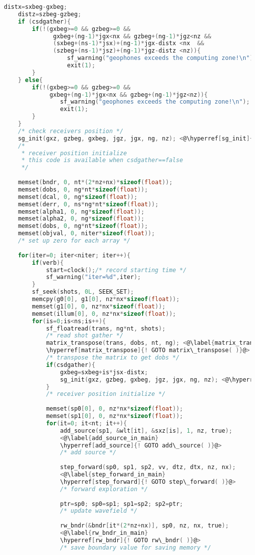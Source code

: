 \documentclass[a4paper,11pt]{article}
\theoremstyle{mytheor}
\begin{document}
\begin{lstlisting}[label={main},language=C,tabsize=4,caption=main()]
	distx=sxbeg-gxbeg;
	distz=szbeg-gzbeg;
	if (csdgather){
		if(!(gxbeg>=0 && gzbeg>=0 && 
		      gxbeg+(ng-1)*jgx<nx && gzbeg+(ng-1)*jgz<nz &&
			  (sxbeg+(ns-1)*jsx)+(ng-1)*jgx-distx <nx  &&
			  (szbeg+(ns-1)*jsz)+(ng-1)*jgz-distz <nz)){ 
				  sf_warning("geophones exceeds the computing zone!\n"); 
				  exit(1); 
		}
	} else{
		if(!(gxbeg>=0 && gzbeg>=0 && 
			 gxbeg+(ng-1)*jgx<nx && gzbeg+(ng-1)*jgz<nz)){
			 	sf_warning("geophones exceeds the computing zone!\n"); 
			 	exit(1); 
		}
	}
	/* check receivers position */
	sg_init(gxz, gzbeg, gxbeg, jgz, jgx, ng, nz); <@\hyperref[sg_init]{! GOTO sg\_init( )}@>
	/* 
	 * receiver position initialize
	 * this code is available when csdgather==false 
	 */
	
	memset(bndr, 0, nt*(2*nz+nx)*sizeof(float));
	memset(dobs, 0, ng*nt*sizeof(float));
	memset(dcal, 0, ng*sizeof(float));
	memset(derr, 0, ns*ng*nt*sizeof(float));
	memset(alpha1, 0, ng*sizeof(float));
	memset(alpha2, 0, ng*sizeof(float));
	memset(dobs, 0, ng*nt*sizeof(float));	
	memset(objval, 0, niter*sizeof(float));
	/* set up zero for each array */
	
	for(iter=0; iter<niter; iter++){
		if(verb){
			start=clock();/* record starting time */
			sf_warning("iter=%d",iter);
		}
		sf_seek(shots, 0L, SEEK_SET);
		memcpy(g0[0], g1[0], nz*nx*sizeof(float));
		memset(g1[0], 0, nz*nx*sizeof(float));
		memset(illum[0], 0, nz*nx*sizeof(float));
		for(is=0;is<ns;is++){
			sf_floatread(trans, ng*nt, shots); 
			/* read shot gather */
			matrix_transpose(trans, dobs, nt, ng); <@\label{matrix_transpose_in_main}
			\hyperref[matrix_transpose]{! GOTO matrix\_transpose( )}@>
			/* transpose the matrix to get dobs */
			if(csdgather){
				gxbeg=sxbeg+is*jsx-distx;
				sg_init(gxz, gzbeg, gxbeg, jgz, jgx, ng, nz); <@\hyperref[sg_init]{! GOTO sg\_init( )}@>
			}
			/* receiver position initialize */
			
			memset(sp0[0], 0, nz*nx*sizeof(float));
			memset(sp1[0], 0, nz*nx*sizeof(float));
			for(it=0; it<nt; it++){
				add_source(sp1, &wlt[it], &sxz[is], 1, nz, true);
				<@\label{add_source_in_main}
				\hyperref[add_source]{! GOTO add\_source( )}@>
				/* add source */
				
				step_forward(sp0, sp1, sp2, vv, dtz, dtx, nz, nx);
				<@\label{step_forward_in_main}
				\hyperref[step_forward]{! GOTO step\_forward( )}@>
				/* forward exploration */
				
				ptr=sp0; sp0=sp1; sp1=sp2; sp2=ptr;
				/* update wavefield */
				
				rw_bndr(&bndr[it*(2*nz+nx)], sp0, nz, nx, true);
				<@\label{rw_bndr_in_main}
				\hyperref[rw_bndr]{! GOTO rw\_bndr( )}@>
				/* save boundary value for saving memory */


\end{lstlisting}
\end{document}
